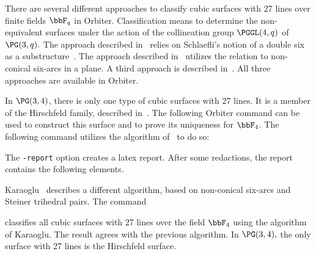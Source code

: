 There are several different approaches to classify 
cubic surfaces with 27 lines over finite fields $\bbF_q$ in Orbiter.
Classification means to determine the non-equivalent surfaces under the action of the 
collineation group $\PGGL(4,q)$ of $\PG(3,q).$
The approach described in~\cite{BettenKaraoglu19a} relies on Schlaefli's notion of 
a double six as a substructure~\cite{Schlaefli58}.
The approach described in~\cite{Karaoglu18} 
utilizes the relation to non-conical six-arcs in a plane.
A third approach is described in~\cite{KaraogluBetten21}.
All three approaches are available in Orbiter.

\bigskip


In $\PG(3,4)$, there is only one type of cubic surfaces with 27 lines. 
It is a member of the Hirschfeld family, described in~\cite{Hirschfeld64}.
The following Orbiter command can be used to construct this surface and to prove its uniqueness 
for $\bbF_4$. 
The following command utilizes the algorithm of~\cite{BettenKaraoglu19a} to do so:
{\tt

}
The \verb'-report' option creates a latex report.
After some redactions, the report contains the following elements.
\begin{mdframed}[style=MyFrame]

\end{mdframed}

\bigskip


Karaoglu~\cite{Karaoglu18} describes a different algorithm, 
based on non-conical six-arcs and Steiner trihedral pairs. 
The command 
{\tt

}
classifies all cubic surfaces with 27 lines over 
the field $\bbF_{4}$ using the algorithm of Karaoglu.
The result agrees with the previous algorithm. 
In $\PG(3,4),$ the only surface with 27 lines is the Hirschfeld surface.



\bigskip




